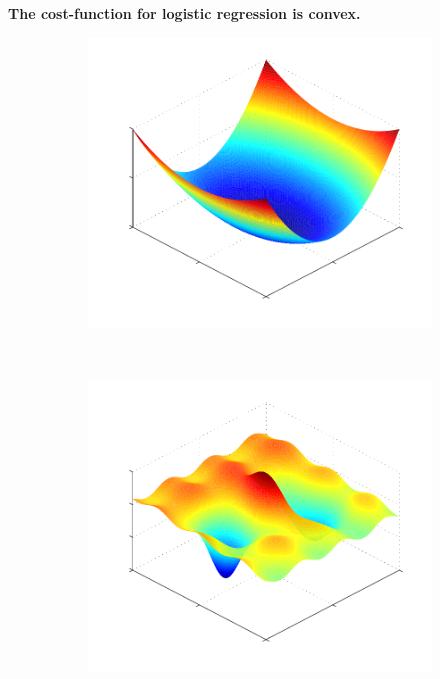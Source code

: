 \textbf{The cost-function for logistic regression is convex.}
\begin{figure}
	\begin{subfigure}[b]{0.45\textwidth}
		\includegraphics[width=\textwidth]{./lecture7/Convex.pdf}
	\end{subfigure}
	~
	\begin{subfigure}[b]{0.45\textwidth}
		\includegraphics[width=\textwidth]{./lecture7/NotConvex.pdf}
	\end{subfigure}	
\end{figure}

